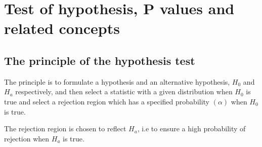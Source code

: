 \documentclass[12pt,a4paper]{article}
\theoremstyle{regla}
\theoremstyle{remark}
\theoremstyle{definition}
\theoremstyle{nonumberbreak}
\begin{document}
\section{Test of hypothesis, P values and related concepts}
\subsection{The principle of the hypothesis test}
\begin{fbox}
\begin{minipage}{0.97\textwidth}
The principle is to formulate a hypothesis and an alternative hypothesis, $H_0$ and $H_a$ respectively, and then select a statistic with a given distribution when $H_0$ is true and select a rejection region which has a specified probability $(\alpha)$ when $H_0$ is true. 

The rejection region is chosen to reflect $H_a$, i.e to ensure a high probability of rejection when $H_a$ is true.

\end{minipage}
\end{fbox}
\end{document}
